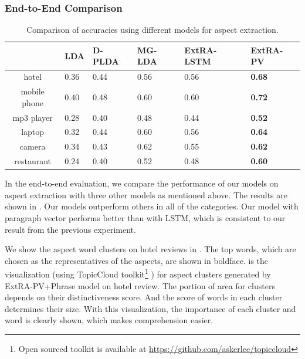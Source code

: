 \subsubsection{End-to-End Comparison}



\begin{table}[th]
	\centering
	\caption{Comparison of accuracies using different models for aspect extraction.}
	\label{table:comparison}
	\begin{tabular}{|c|C{0.9cm}|C{0.9cm}|C{0.9cm}|C{0.9cm}|C{0.9cm}|}
		\hline
		& LDA & D-PLDA & MG-LDA & ExtRA-LSTM & ExtRA-PV \\ \hline
		hotel &0.36 & 0.44 & 0.56 & 0.56 & \textbf{0.68} \\ \hline
		mobile phone & 0.40 & 0.48 & 0.60 & 0.60 & \textbf{0.72} \\ \hline
		mp3 player & 0.28 & 0.40 & 0.48 & 0.44 & \textbf{0.52} \\ \hline
		laptop & 0.32 & 0.44 & 0.60 & 0.56 & \textbf{0.64} \\ \hline
		camera & 0.34 & 0.43 & 0.62 & 0.55 & \textbf{0.62} \\ \hline
		restaurant & 0.24 & 0.40 & 0.52 & 0.48 & \textbf{0.60} \\ \hline
	\end{tabular}
\end{table}


In the end-to-end evaluation, we compare the performance of our models on aspect extraction with three other models as mentioned above. The results are shown in . Our models outperform others in all of the categories. 
Our model with paragraph vector performs better than with LSTM, 
which is consistent to our result from the previous experiment.

We show the aspect word clusters on hotel reviews in . The top words, which are chosen as the representatives of the aspects, are shown in boldface. 
 is the visualization (using TopicCloud toolkit\footnote{Open sourced toolkit is available at \url{https://github.com/askerlee/topiccloud}} \cite{li2017document}) for aspect clusters generated by ExtRA-PV+Phrase model on hotel review.
The portion of area for clusters depends on their distinctiveness score.
And the score of words in each cluster determines their size. With this visualization, the importance of each cluster and word is clearly shown, which makes comprehension easier. 


